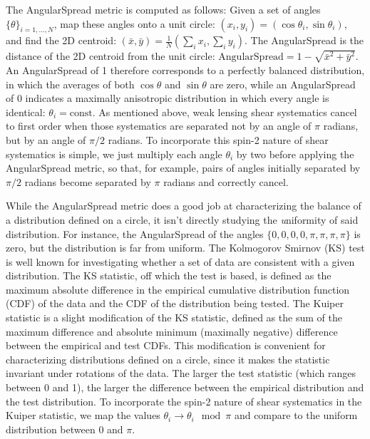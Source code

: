 The AngularSpread metric is computed as follows:  Given a set of angles $\{\theta\}_{i=1, ..., N}$,
map these angles onto a unit circle: $(x_i, y_i) = (\cos \theta_i, \sin \theta_i)$, and find the 2D
centroid: $(\bar{x}, \bar{y}) = \frac{1}{N} (\sum_i x_i, \sum_i y_i)$.  The AngularSpread is the
distance of the 2D centroid from the unit circle:
$\mathrm{AngularSpread} = 1 - \sqrt{\bar{x}^2 + \bar{y}^2}$.  An AngularSpread of 1 therefore
corresponds to a perfectly balanced distribution, in which the averages of both $\cos \theta$ and
$\sin \theta$ are zero, while an AngularSpread of 0 indicates a maximally anisotropic distribution
in which every angle is identical: $\theta_i = \mathrm{const}$.  As mentioned above, weak lensing
shear systematics cancel to first order when those systematics are separated not by an angle of
$\pi$ radians, but by an angle of $\pi/2$ radians.  To incorporate this spin-2 nature of shear
systematics is simple, we just multiply each angle $\theta_i$ by two before applying the
AngularSpread metric, so that, for example, pairs of angles initially separated by $\pi/2$ radians
become separated by $\pi$ radians and correctly cancel.

While the AngularSpread metric does a good job at characterizing the balance of a distribution
defined on a circle, it isn't directly studying the {\emph uniformity} of said distribution.  For
instance, the AngularSpread of the angles $\{0, 0, 0, 0, \pi, \pi, \pi, \pi\}$ is zero, but the
distribution is far from uniform.  The Kolmogorov Smirnov (KS) test is well known for investigating
whether a set of data are consistent with a given distribution.  The KS statistic, off which the
test is based, is defined as the maximum absolute difference in the empirical cumulative
distribution function (CDF) of the data and the CDF of the distribution being tested.  The Kuiper
statistic is a slight modification of the KS statistic, defined as the sum of the maximum difference
and absolute minimum (maximally negative) difference between the empirical and test CDFs.  This
modification is convenient for characterizing distributions defined on a circle, since it makes the
statistic invariant under rotations of the data.  The larger the test statistic (which ranges
between 0 and 1), the larger the difference between the empirical distribution and the test
distribution.  To incorporate the spin-2 nature of shear systematics in the Kuiper statistic, we map
the values $\theta_i \rightarrow \theta_i \mod \pi$ and compare to the uniform distribution between
0 and $\pi$.


